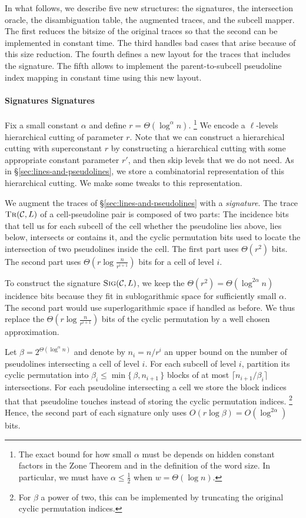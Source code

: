 In what follows, we describe five new structures:
the signatures,
the intersection oracle,
the disambiguation table,
the augmented traces,
and the subcell mapper.
%
The first reduces the bitsize of the original traces so that the second can
be implemented in constant time. The third handles bad cases that arise because
of this size reduction. The fourth defines a new layout for the traces that
includes the signature. The fifth allows to implement the parent-to-subcell
pseudoline index mapping in constant time using this new layout.
%
\paragraph*{\iftitlecase%
Signatures\else%
Signatures\fi}
Fix a small constant \(\alpha\) and define \(r = \Theta(\log^{\alpha} n)\).%
\footnote{%
  The exact bound for how small \(\alpha\)
  must be depends on hidden constant factors in the Zone Theorem and in the definition
  of the word size. In particular, we must have \(\alpha \leq \frac 12\) when
  \(w = \Theta(\log n)\).%
}
%
We encode a \(\ell\)-levels hierarchical cutting of parameter \(r\).
%
Note that we can construct a hierarchical cutting with
superconstant \(r\) by constructing a hierarchical cutting with some
appropriate constant parameter \(r'\), and then skip levels that we do not
need.
%
As in \S\ref{sec:lines-and-pseudolines}, we store a combinatorial representation of
this hierarchical cutting. We make some tweaks to this representation.

We augment the traces of \S\ref{sec:lines-and-pseudolines} with a \emph{signature}.
The trace \(\textsc{Tr}(\mathcal{C}, L)\) of a cell-pseudoline pair
is composed of two parts:
The incidence bits
that tell us for each subcell of the cell whether the pseudoline lies above, lies below, intersects
or contains it, and the cyclic permutation bits used to locate the intersection
of two pseudolines inside the cell.
The first part uses \(\Theta(r^2)\) bits.
The second part uses \(\Theta(r \log{\frac{n}{r^{i+1}}})\) bits for a cell of
level \(i\).

To construct the signature \(\textsc{Sig}(\mathcal{C}, L)\),
we keep the \(\Theta(r^2) = \Theta(\log^{2\alpha} n)\) incidence bits because
they fit in sublogarithmic space for sufficiently small \(\alpha\).
The second part would use superlogarithmic space if handled as before.
We thus replace the \(\Theta(r \log{\frac{n}{r^{i+1}}})\) bits of the
cyclic permutation by a well chosen approximation.

Let \(\beta = 2^{\Theta(\log^{\alpha} n)}\) and denote by \(n_i = n/r^i\)
an upper bound on the number of pseudolines intersecting a cell of level \(i\). For
each subcell of level \(i\), partition its cyclic permutation into
\(\beta_i \leq \min \{\, \beta , n_{i+1} \,\} \) blocks
of at most \(\lceil n_{i+1} / \beta_i \rceil\) intersections.
%
For each pseudoline intersecting a cell we store the block indices that
that pseudoline touches instead of storing the cyclic permutation indices.%
\footnote{For \(\beta\) a power of two, this can be implemented by truncating
the original cyclic permutation indices.}
Hence, the second part
of each signature only uses \(O(r \log \beta) = O(\log^{2\alpha})\) bits.

